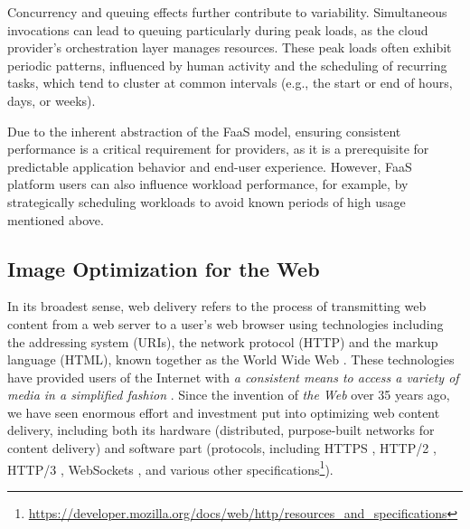 
Concurrency and queuing effects further contribute \cite{shahrad2019architectural} to variability. Simultaneous invocations can lead to queuing particularly during peak loads, as the cloud provider's orchestration layer manages resources. These peak loads often exhibit periodic patterns, influenced by human activity and the scheduling of recurring tasks, which tend to cluster at common intervals (e.g., the start or end of hours, days, or weeks).


Due to the inherent abstraction of the FaaS model, ensuring consistent performance is a critical requirement for providers, as it is a prerequisite for predictable application behavior and end-user experience. However, FaaS platform users can also influence workload performance, for example, by strategically scheduling workloads to avoid known periods of high usage mentioned above.


\subsection{Image Optimization for the Web}

In its broadest sense, web delivery refers to the process of transmitting web content from a web server to a user's web browser using technologies including the addressing system (URIs), the network protocol (HTTP) and the markup language (HTML), known together as the World Wide Web \cite{berners1994world}. These technologies have provided users of the Internet with \emph{a consistent means to access a variety of media in a simplified fashion} \cite{hughes1994entering}. Since the invention of \emph{the Web} over 35 years ago, we have seen enormous effort and investment put into optimizing web content delivery, including both its hardware (distributed, purpose-built networks for content delivery) and software part (protocols, including HTTPS \cite{fielding2022rfc-http-semantics}, HTTP/2 \cite{thomson2022rfc-http2}, HTTP/3 \cite{bishop2022rfc-http3}, WebSockets \cite{fette2021rfc-websockets}, and various other specifications\footnote{\url{https://developer.mozilla.org/docs/web/http/resources_and_specifications}}).

